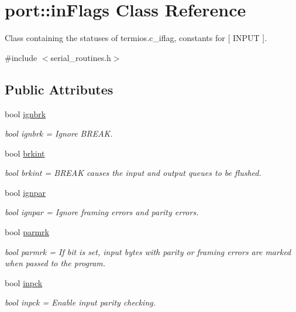 \hypertarget{classport_1_1inFlags}{}\section{port\+:\+:in\+Flags Class Reference}
\label{classport_1_1inFlags}


Class containing the statuses of termios.\+c\+\_\+iflag, constants for \mbox{[} I\+N\+P\+UT \mbox{]}.  




{\ttfamily \#include $<$serial\+\_\+routines.\+h$>$}

\subsection*{Public Attributes}
\begin{DoxyCompactItemize}
\item 
bool \hyperlink{classport_1_1inFlags_a2f5e99598ddb18261c996e873602b32a}{ignbrk}
\begin{DoxyCompactList}\small\item\em bool ignbrk = Ignore B\+R\+E\+AK. \end{DoxyCompactList}\item 
bool \hyperlink{classport_1_1inFlags_a47a2644d51869bc062b68f9eff0f4833}{brkint}
\begin{DoxyCompactList}\small\item\em bool brkint = B\+R\+E\+AK causes the input and output queues to be flushed. \end{DoxyCompactList}\item 
bool \hyperlink{classport_1_1inFlags_acee23afe5adf90a8f50ad190eb30e70c}{ignpar}
\begin{DoxyCompactList}\small\item\em bool ignpar = Ignore framing errors and parity errors. \end{DoxyCompactList}\item 
bool \hyperlink{classport_1_1inFlags_a7d187e7323766b568aef6093e7b36a4e}{parmrk}
\begin{DoxyCompactList}\small\item\em bool parmrk = If bit is set, input bytes with parity or framing errors are marked when passed to the program. \end{DoxyCompactList}\item 
bool \hyperlink{classport_1_1inFlags_af29fc919bb4310b36924ba6e3de5cda8}{inpck}
\begin{DoxyCompactList}\small\item\em bool inpck = Enable input parity checking. \end{DoxyCompactList}\item 

\end{DoxyCompactItemize}

